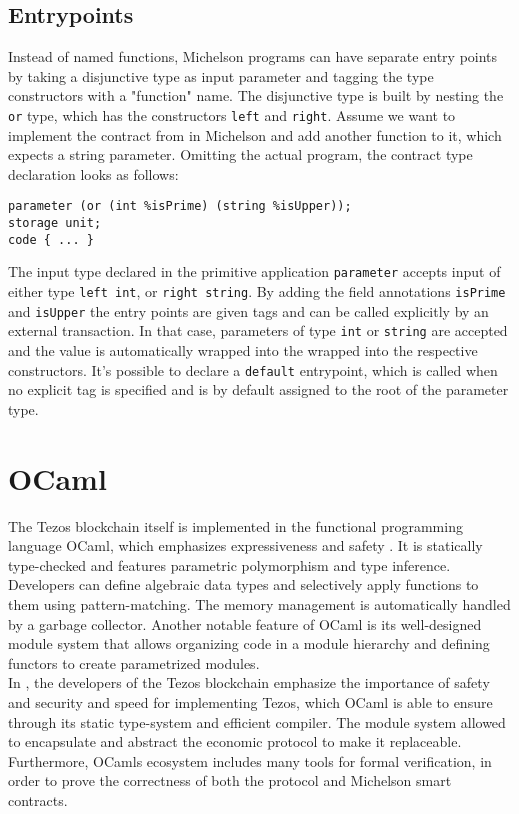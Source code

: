 \subsection{Entrypoints}
Instead of named functions, Michelson programs can have separate entry points by taking a disjunctive type as input parameter and tagging the type constructors with a "function" name. The disjunctive type is built by nesting the \texttt{or} type, which has the constructors \texttt{left} and \texttt{right}. Assume we want to implement the contract from  in Michelson and add another function to it, which expects a string parameter. Omitting the actual program, the contract type declaration looks as follows:
\begin{lstlisting}[language=Michelson, numbers=none]
parameter (or (int %isPrime) (string %isUpper));
storage unit;
code { ... }
\end{lstlisting}
The input type declared in the primitive application \texttt{parameter} accepts input of either type \texttt{left int}, or \texttt{right string}. By adding the field annotations \texttt{isPrime} and \texttt{isUpper} the entry points are given tags and can be called explicitly by an external transaction. In that case, parameters of type \texttt{int} or \texttt{string} are accepted and the value is automatically wrapped into the wrapped into the respective constructors. It's possible to declare a \texttt{default} entrypoint, which is called when no explicit tag is specified and is by default assigned to the root of the parameter type.


\section{OCaml}
The Tezos blockchain itself is implemented in the functional programming language OCaml, which emphasizes expressiveness and safety \cite{ocaml_doc}. It is statically type-checked and features parametric polymorphism and type inference. Developers can define algebraic data types and selectively apply functions to them using pattern-matching. The memory management is automatically handled by a garbage collector. Another notable feature of OCaml is its well-designed module system that allows organizing code in a module hierarchy and defining functors to create parametrized modules.\\
In \cite{canou_tezos_nodate}, the developers of the Tezos blockchain emphasize the importance of safety and security and speed for implementing Tezos, which OCaml is able to ensure through its static type-system and efficient compiler. The module system allowed to encapsulate and abstract the economic protocol to make it replaceable. Furthermore, OCamls ecosystem includes many tools for formal verification, in order to prove the correctness of both the protocol and Michelson smart contracts.

